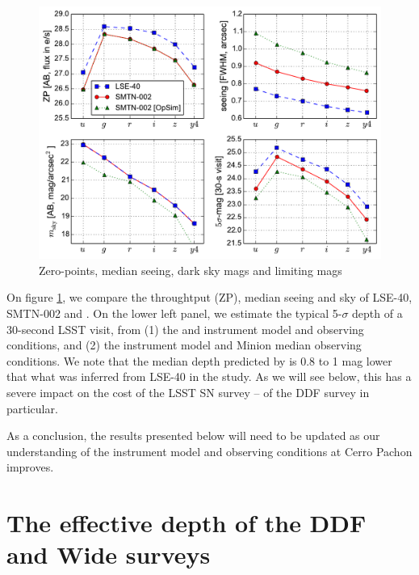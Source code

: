 \documentclass[\docopts]{\docclass}
\begin{document}
\begin{figure}[t]
\begin{center}
\includegraphics[width=\linewidth]{lsst_model_summary.pdf}
\caption{Zero-points, median seeing, dark sky mags and limiting mags}
\label{fig:lsst_model_summary}
\end{center}
\end{figure}


On figure \ref{fig:lsst_model_summary}, we compare the throughtput
(ZP), median seeing and sky of LSE-40, SMTN-002 and
.  On the lower left panel, we estimate the typical
5-$\sigma$ depth of a 30-second LSST visit, from (1) the 
and  instrument model and observing conditions, and (2)
the  instrument model and Minion median observing
conditions. We note that the median depth predicted by 
is 0.8 to 1 mag lower that what was inferred from LSE-40 in the
\cite{2014A&A...572A..80A} study. As we will see below, this has a
severe impact on the cost of the LSST SN survey -- of the DDF survey
in particular.

As a conclusion, the results presented below will need to be updated
as our understanding of the instrument model and observing conditions
at Cerro Pachon improves. 




\section{The effective depth of the DDF and Wide surveys}
\label{sec:effective_depth}
\end{document}
